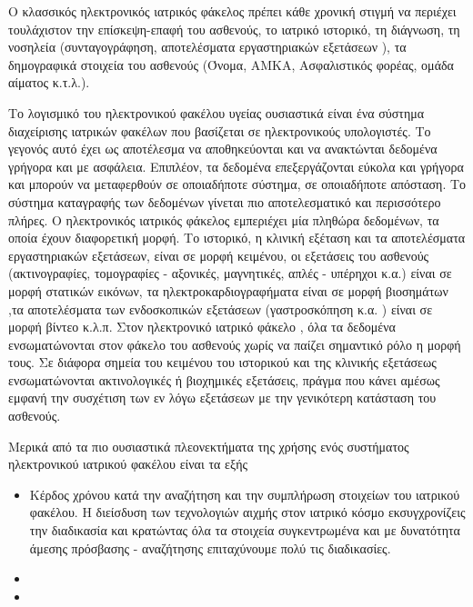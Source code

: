 	
		Ο κλασσικός ηλεκτρονικός ιατρικός φάκελος πρέπει κάθε χρονική στιγμή να περιέχει τουλάχιστον την επίσκεψη-επαφή του ασθενούς, το ιατρικό ιστορικό, τη διάγνωση, τη νοσηλεία (συνταγογράφηση, αποτελέσματα εργαστηριακών εξετάσεων ), τα δημογραφικά στοιχεία του ασθενούς (Όνομα, ΑΜΚΑ, Ασφαλιστικός φορέας, ομάδα αίματος κ.τ.λ.).


Το λογισμικό του ηλεκτρονικού φακέλου υγείας ουσιαστικά είναι ένα σύστημα διαχείρισης ιατρικών φακέλων που βασίζεται σε ηλεκτρονικούς υπολογιστές. Το γεγονός αυτό έχει ως αποτέλεσμα να αποθηκεύονται και να ανακτώνται δεδομένα γρήγορα και με ασφάλεια. Επιπλέον, τα δεδομένα επεξεργάζονται εύκολα και γρήγορα και μπορούν να μεταφερθούν σε οποιαδήποτε σύστημα, σε οποιαδήποτε απόσταση. Το σύστημα καταγραφής των δεδομένων γίνεται πιο αποτελεσματικό και περισσότερο πλήρες. Ο ηλεκτρονικός ιατρικός φάκελος εμπεριέχει μία πληθώρα δεδομένων, τα οποία έχουν διαφορετική μορφή. Το ιστορικό, η κλινική εξέταση και τα αποτελέσματα εργαστηριακών εξετάσεων, είναι σε μορφή κειμένου, οι εξετάσεις του ασθενούς (ακτινογραφίες, τομογραφίες - αξονικές, μαγνητικές, απλές - υπέρηχοι κ.α.) είναι σε μορφή στατικών εικόνων, τα ηλεκτροκαρδιογραφήματα είναι σε μορφή βιοσημάτων ,τα αποτελέσματα των ενδοσκοπικών εξετάσεων (γαστροσκόπηση κ.α. ) είναι σε μορφή βίντεο κ.λ.π.  Στον ηλεκτρονικό ιατρικό φάκελο , όλα τα δεδομένα ενσωματώνονται στον φάκελο του ασθενούς χωρίς να παίζει σημαντικό ρόλο η μορφή τους. Σε διάφορα σημεία του κειμένου του ιστορικού και της κλινικής εξετάσεως ενσωματώνονται ακτινολογικές ή βιοχημικές εξετάσεις, πράγμα που κάνει αμέσως εμφανή την συσχέτιση των εν λόγω εξετάσεων με την γενικότερη κατάσταση του ασθενούς.

Μερικά από τα πιο ουσιαστικά πλεονεκτήματα της χρήσης ενός συστήματος ηλεκτρονικού ιατρικού φακέλου είναι τα εξής
\begin{itemize}

\item Κέρδος χρόνου κατά την αναζήτηση και την συμπλήρωση στοιχείων του ιατρικού φακέλου. Η διείσδυση των τεχνολογιών αιχμής στον ιατρικό κόσμο εκσυγχρονίζεις την διαδικασία και κρατώντας όλα τα στοιχεία συγκεντρωμένα και με δυνατότητα άμεσης πρόσβασης - αναζήτησης επιταχύνουμε πολύ τις διαδικασίες.


\item

\item


\end{itemize}



